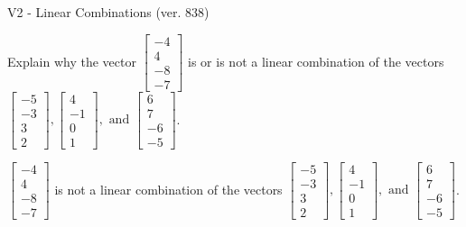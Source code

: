 \begin{exercise}
  \begin{exerciseTitle}V2 - Linear Combinations (ver. 838)\end{exerciseTitle}
  \begin{exerciseStatement}
    Explain why the vector \(\left[\begin{array}{c}
-4 \\
4 \\
-8 \\
-7
\end{array}\right]\)  is or is not a linear 
	combination of the vectors \(\left[\begin{array}{c}
-5 \\
-3 \\
3 \\
2
\end{array}\right] , \left[\begin{array}{c}
4 \\
-1 \\
0 \\
1
\end{array}\right] , \text{ and } \left[\begin{array}{c}
6 \\
7 \\
-6 \\
-5
\end{array}\right]\).
	


  \end{exerciseStatement}
  \begin{exerciseAnswer}
   \(\left[\begin{array}{c}
-4 \\
4 \\
-8 \\
-7
\end{array}\right]\) 
  	 is not  
	a linear combination of the vectors \(\left[\begin{array}{c}
-5 \\
-3 \\
3 \\
2
\end{array}\right] , \left[\begin{array}{c}
4 \\
-1 \\
0 \\
1
\end{array}\right] , \text{ and } \left[\begin{array}{c}
6 \\
7 \\
-6 \\
-5
\end{array}\right]\).

	
  


  \end{exerciseAnswer}
\end{exercise}